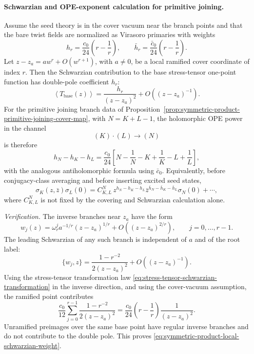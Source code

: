 \paragraph{Schwarzian and OPE-exponent calculation for primitive joining.}
Assume the seed theory is in the cover vacuum near the branch points and that
the bare twist fields are normalized as Virasoro primaries with weights
\[
  h_r=\frac{c_0}{24}\left(r-\frac1r\right),
  \qquad
  \bar h_r=\frac{\bar c_0}{24}\left(r-\frac1r\right).
\]
Let \(z-z_a=a w^r+O(w^{r+1})\), with \(a\ne0\), be a local ramified cover
coordinate of index \(r\).  Then the Schwarzian contribution to the base
stress-tensor one-point function has double-pole coefficient \(h_r\):
\begin{equation}
  \left\langle T_{\mathrm{base}}(z)\right\rangle
  =
  \frac{h_r}{(z-z_a)^2}+O((z-z_a)^{-1}).
  \label{eq:symmetric-product-local-schwarzian-weight}
\end{equation}
For the primitive joining branch data of
Proposition~\ref{prop:symmetric-product-primitive-joining-cover-map}, with
\(N=K+L-1\), the holomorphic OPE power in the channel
\[
  (K)\cdot(L)\longrightarrow (N)
\]
is therefore
\begin{equation}
  h_N-h_K-h_L
  =
  \frac{c_0}{24}
  \left[
    N-\frac1N
    -K+\frac1K
    -L+\frac1L
  \right],
  \label{eq:symmetric-product-primitive-joining-ope-power}
\end{equation}
with the analogous antiholomorphic formula using \(\bar c_0\).  Equivalently,
before conjugacy-class averaging and before inserting excited seed states,
\begin{equation}
  \sigma_K(z,\bar z)\sigma_L(0)
  =
  C_{K,L}^{N}\,
  z^{h_N-h_K-h_L}
  \bar z^{\bar h_N-\bar h_K-\bar h_L}
  \sigma_N(0)+\cdots ,
  \label{eq:symmetric-product-primitive-joining-ope}
\end{equation}
where \(C_{K,L}^{N}\) is not fixed by the covering and Schwarzian calculation alone.

\emph{Verification.}
The inverse branches near \(z_a\) have the form
\[
  w_j(z)
  =
  \omega_r^j a^{-1/r}(z-z_a)^{1/r}+O((z-z_a)^{2/r}),
  \qquad
  j=0,\ldots,r-1 .
\]
The leading Schwarzian of any such branch is independent of \(a\) and of the
root label:
\[
  \{w_j,z\}
  =
  \frac{1-r^{-2}}{2(z-z_a)^2}+O((z-z_a)^{-1}).
\]
Using the stress-tensor transformation law
\eqref{eq:stress-tensor-schwarzian-transformation} in the inverse direction,
and using the cover-vacuum assumption, the ramified point contributes
\[
  \frac{c_0}{12}
  \sum_{j=0}^{r-1}
  \frac{1-r^{-2}}{2(z-z_a)^2}
  =
  \frac{c_0}{24}\left(r-\frac1r\right)\frac1{(z-z_a)^2}.
\]
Unramified preimages over the same base point have regular inverse branches
and do not contribute to the double pole.  This proves
\eqref{eq:symmetric-product-local-schwarzian-weight}.

